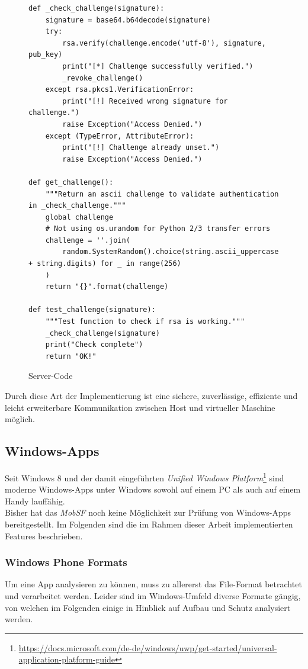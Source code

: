 \begin{figure}
\begin{lstlisting}
def _check_challenge(signature):
    signature = base64.b64decode(signature)
    try:
        rsa.verify(challenge.encode('utf-8'), signature, pub_key)
        print("[*] Challenge successfully verified.")
        _revoke_challenge()
    except rsa.pkcs1.VerificationError:
        print("[!] Received wrong signature for challenge.")
        raise Exception("Access Denied.")
    except (TypeError, AttributeError):
        print("[!] Challenge already unset.")
        raise Exception("Access Denied.")

def get_challenge():
    """Return an ascii challenge to validate authentication in _check_challenge."""
    global challenge
    # Not using os.urandom for Python 2/3 transfer errors
    challenge = ''.join(
        random.SystemRandom().choice(string.ascii_uppercase + string.digits) for _ in range(256)
    )
    return "{}".format(challenge)
    
def test_challenge(signature):
    """Test function to check if rsa is working."""
    _check_challenge(signature)
    print("Check complete")
    return "OK!"
\end{lstlisting}
\caption{Server-Code}
\label{ref:WeitEntXMLServer}
\end{figure}

Durch diese Art der Implementierung ist eine sichere, zuverlässige, effiziente und leicht erweiterbare Kommunikation zwischen Host und virtueller Maschine möglich.

\newpage
\subsection{Windows-Apps}
\label{Windows-Apps}
Seit Windows 8 und der damit eingeführten \textit{Unified Windows Platform}\footnote{\url{https://docs.microsoft.com/de-de/windows/uwp/get-started/universal-application-platform-guide}} sind moderne Windows-Apps unter Windows sowohl auf einem PC als auch auf einem Handy lauffähig.\\

Bisher hat das \textit{MobSF} noch keine Möglichkeit zur Prüfung von Windows-Apps bereitgestellt. Im Folgenden sind die im Rahmen dieser Arbeit implementierten Features beschrieben.

\subsubsection{Windows Phone Formats}
Um eine App analysieren zu können, muss zu allererst das File-Format betrachtet und verarbeitet werden. Leider sind im Windows-Umfeld diverse Formate gängig, von welchen im Folgenden einige in Hinblick auf Aufbau und Schutz analysiert werden.

